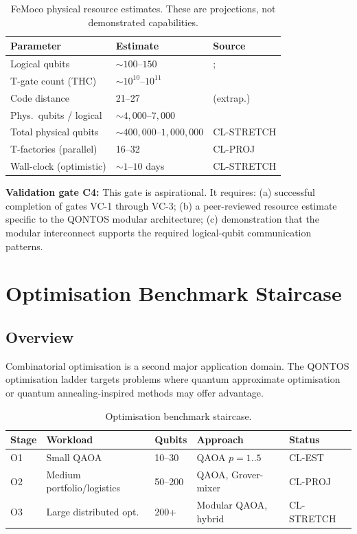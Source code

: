 \documentclass[conference]{IEEEtran}
\begin{document}
\begin{table}[H]
\centering
\caption{FeMoco physical resource estimates. These are projections, not demonstrated capabilities.}
\label{tab:femoco}
\begin{tabular}{@{}l l l@{}}
\toprule
\textbf{Parameter} & \textbf{Estimate} & \textbf{Source} \\
\midrule
Logical qubits & ${\sim}100$--$150$ & \cite{reiher2017}; \cite{lee2021} \\
T-gate count (THC) & ${\sim}10^{10}$--$10^{11}$ & \cite{lee2021} \\
Code distance & 21--27 & \cite{beverland2022} (extrap.) \\
Phys.\ qubits / logical & ${\sim}4{,}000$--$7{,}000$ & \cite{beverland2022} \\
Total physical qubits & ${\sim}400{,}000$--$1{,}000{,}000$ & CL-STRETCH \\
T-factories (parallel) & 16--32 & CL-PROJ \\
Wall-clock (optimistic) & ${\sim}1$--$10$ days & CL-STRETCH \\
\bottomrule
\end{tabular}
\end{table}

\textbf{Validation gate C4:} This gate is aspirational. It requires: (a) successful
completion of gates VC-1 through VC-3; (b) a peer-reviewed resource estimate specific
to the QONTOS modular architecture; (c) demonstration that the modular interconnect
supports the required logical-qubit communication patterns.

\section{Optimisation Benchmark Staircase}

\subsection{Overview}

Combinatorial optimisation is a second major application domain. The QONTOS
optimisation ladder targets problems where quantum approximate optimisation or
quantum annealing-inspired methods may offer advantage.

\begin{table}[H]
\centering
\caption{Optimisation benchmark staircase.}
\begin{tabular}{@{}l l l l l@{}}
\toprule
\textbf{Stage} & \textbf{Workload} & \textbf{Qubits} & \textbf{Approach} & \textbf{Status} \\
\midrule
O1 & Small QAOA & 10--30 & QAOA $p{=}1..5$ & CL-EST \\
O2 & Medium portfolio/logistics & 50--200 & QAOA, Grover-mixer & CL-PROJ \\
O3 & Large distributed opt. & 200+ & Modular QAOA, hybrid & CL-STRETCH \\
\bottomrule
\end{tabular}
\end{table}
\end{document}
